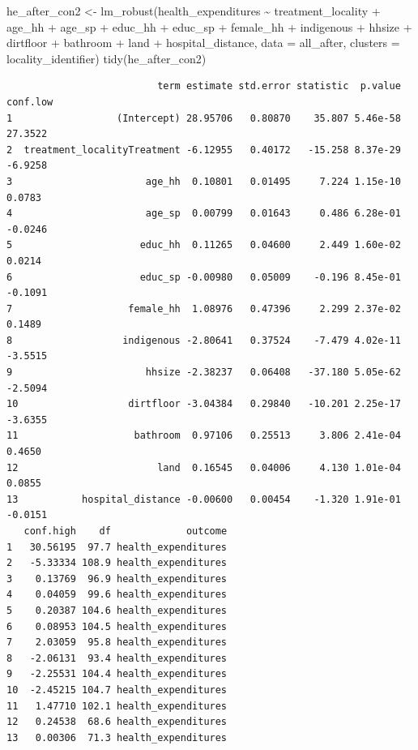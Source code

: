 \documentclass[
  letterpaper,
  DIV=11,
  numbers=noendperiod]{scrartcl}
\newenvironment{Shaded}{\begin{snugshade}}{\end{snugshade}}
\newcommand{\AttributeTok}[1]{\textcolor[rgb]{0.40,0.45,0.13}{#1}}
\newcommand{\FunctionTok}[1]{\textcolor[rgb]{0.28,0.35,0.67}{#1}}
\newcommand{\NormalTok}[1]{\textcolor[rgb]{0.00,0.23,0.31}{#1}}
\newcommand{\OtherTok}[1]{\textcolor[rgb]{0.00,0.23,0.31}{#1}}
\newcommand{\SpecialCharTok}[1]{\textcolor[rgb]{0.37,0.37,0.37}{#1}}
\begin{document}
\begin{Shaded}
\begin{Highlighting}[numbers=left,,]
\NormalTok{he\_after\_con2 }\OtherTok{\textless{}{-}} \FunctionTok{lm\_robust}\NormalTok{(health\_expenditures }\SpecialCharTok{\textasciitilde{}}\NormalTok{ treatment\_locality }\SpecialCharTok{+}\NormalTok{ age\_hh }\SpecialCharTok{+}\NormalTok{ age\_sp }\SpecialCharTok{+} 
\NormalTok{                           educ\_hh }\SpecialCharTok{+}\NormalTok{ educ\_sp }\SpecialCharTok{+}\NormalTok{ female\_hh }\SpecialCharTok{+}\NormalTok{ indigenous }\SpecialCharTok{+}\NormalTok{ hhsize }\SpecialCharTok{+} 
\NormalTok{                           dirtfloor }\SpecialCharTok{+}\NormalTok{ bathroom }\SpecialCharTok{+}\NormalTok{ land }\SpecialCharTok{+}\NormalTok{ hospital\_distance, }
                           \AttributeTok{data =}\NormalTok{ all\_after, }\AttributeTok{clusters =}\NormalTok{ locality\_identifier)}
\FunctionTok{tidy}\NormalTok{(he\_after\_con2)}
\end{Highlighting}
\end{Shaded}

\begin{verbatim}
                          term estimate std.error statistic  p.value conf.low
1                  (Intercept) 28.95706   0.80870    35.807 5.46e-58  27.3522
2  treatment_localityTreatment -6.12955   0.40172   -15.258 8.37e-29  -6.9258
3                       age_hh  0.10801   0.01495     7.224 1.15e-10   0.0783
4                       age_sp  0.00799   0.01643     0.486 6.28e-01  -0.0246
5                      educ_hh  0.11265   0.04600     2.449 1.60e-02   0.0214
6                      educ_sp -0.00980   0.05009    -0.196 8.45e-01  -0.1091
7                    female_hh  1.08976   0.47396     2.299 2.37e-02   0.1489
8                   indigenous -2.80641   0.37524    -7.479 4.02e-11  -3.5515
9                       hhsize -2.38237   0.06408   -37.180 5.05e-62  -2.5094
10                   dirtfloor -3.04384   0.29840   -10.201 2.25e-17  -3.6355
11                    bathroom  0.97106   0.25513     3.806 2.41e-04   0.4650
12                        land  0.16545   0.04006     4.130 1.01e-04   0.0855
13           hospital_distance -0.00600   0.00454    -1.320 1.91e-01  -0.0151
   conf.high    df             outcome
1   30.56195  97.7 health_expenditures
2   -5.33334 108.9 health_expenditures
3    0.13769  96.9 health_expenditures
4    0.04059  99.6 health_expenditures
5    0.20387 104.6 health_expenditures
6    0.08953 104.5 health_expenditures
7    2.03059  95.8 health_expenditures
8   -2.06131  93.4 health_expenditures
9   -2.25531 104.4 health_expenditures
10  -2.45215 104.7 health_expenditures
11   1.47710 102.1 health_expenditures
12   0.24538  68.6 health_expenditures
13   0.00306  71.3 health_expenditures
\end{verbatim}
\end{document}
